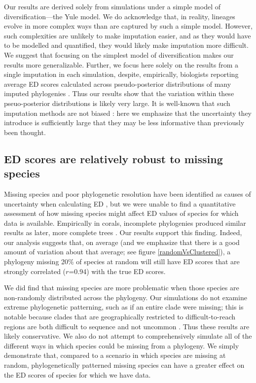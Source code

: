 \documentclass[12pt,english]{article}
\begin{document}
Our results are derived solely from simulations under a simple model of
diversification---the Yule model. We do acknowledge that, in reality, lineages
evolve in more complex ways than are captured by such a simple model. However,
such complexities are unlikely to make imputation easier, and as they would have
to be modelled and quantified, they would likely make imputation more difficult.
We suggest that focusing on the simplest model of diversification makes our
results more generalizable. Further, we focus here solely on the results from a
single imputation in each simulation, despite, empirically, biologists reporting
average ED scores calculated across pseudo-posterior distributions of many
imputed phylogenies \autocite{Kuhn2011}. Thus our results show that the
variation within these pseuo-posterior distributions is likely very large. It is
well-known that such imputation methods are not biased \autocite[indeed, this
was originally shown by][]{Kuhn2011}: here we emphasize that the uncertainty
they introduce is sufficiently large that they may be less informative than
previously been thought.

\subsection*{ED scores are relatively robust to missing species}
Missing species and poor phylogenetic resolution have been identified as causes
of uncertainty when calculating ED \autocite{Isaac2007}, but we were unable to
find a quantitative assessment of how missing species might affect ED values of
species for which data is available. Empirically in corals, incomplete phylogenies
produced similar results as later, more complete trees \autocite{Curnick2015}.
Our results support this finding. Indeed, our analysis suggests that, on average
(and we emphasize that there is a good amount of variation about that average;
see figure \ref{randomVsClustered}), a phylogeny missing 20\% of species at random will
still have ED scores that are strongly correlated ($r$=0.94) with the true ED
scores.

We did find that missing species are more problematic when those species are
non-randomly distributed across the phylogeny. Our simulations do not examine
extreme phylogenetic patterning, such as if an entire clade were missing; this
is notable because clades that are geographically restricted to
difficult-to-reach regions are both difficult to sequence and not uncommon
\autocite[as is seen with 27 coral species in the Indian
Ocean;][]{Arrigoni2012}. Thus these results are likely conservative. We also do
not attempt to comprehensively simulate all of the different ways in which
species could be missing from a phylogeny. We simply demonstrate that, compared
to a scenario in which species are missing at random,
phylogenetically patterned missing species can have a greater effect on the ED
scores of species for which we have data.
\end{document}
